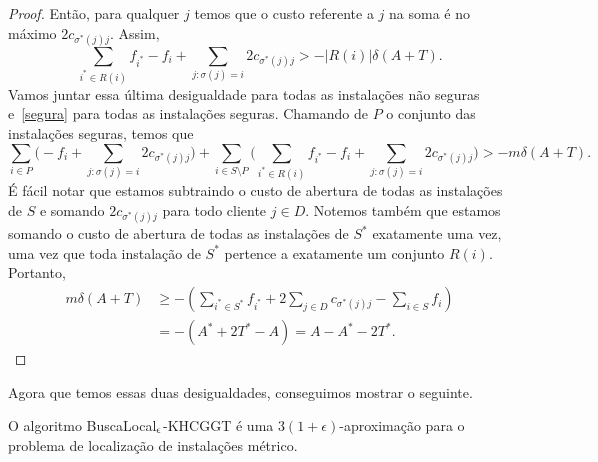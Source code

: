 \begin{proof}
    Então, para qualquer $j$ temos que o custo referente a $j$ na soma é no máximo $2c_{\sigma^*(j)j}$. Assim,
    \[\sum_{i^* \in R(i)}f_{i^*} - f_i + \sum_{j: \sigma(j)= i } 2c_{\sigma^*(j)j} > - |R(i)| \delta(A+T).\]
    Vamos juntar essa última desigualdade para todas as instalações não seguras e~\eqref{segura} para todas as instalações seguras. Chamando de $P$ o conjunto das instalações seguras, temos que
    \[\sum_{i \in P}\Big( - f_i + \sum_{j:\sigma(j) = i} 2c_{\sigma^*(j)j}\Big) + \sum_{i \in S\setminus P}\Big( \sum_{i^* \in R(i)}f_{i^*} - f_i + \sum_{j: \sigma(j)= i } 2c_{\sigma^*(j)j}\Big ) > - m \delta(A+T). \]
    É fácil notar que estamos subtraindo o custo de abertura de todas as instalações de $S$ e somando $2c_{\sigma^*(j)j}$ para todo cliente $j\in D$. Notemos também que estamos somando o custo de abertura de todas as instalações de $S^*$ exatamente uma vez, uma vez que toda instalação de $S^*$ pertence a exatamente um conjunto $R(i)$. Portanto,
    \begin{subequations}
        \begin{align*}
            m\delta(A+T) &\geq - (\sum_{i^* \in S^*}f_{i^*} + 2 \sum_{j \in D} c_{\sigma^*(j)j} - \sum_{i \in S} f_i)\\
            & = - ( A^* + 2 T^* - A ) = A - A^* - 2T^* .
        \end{align*}
    \end{subequations}
\end{proof}

Agora que temos essas duas desigualdades, conseguimos mostrar o seguinte.

\begin{theorem}
    O algoritmo {\sc BuscaLocal$_\epsilon$-KHCGGT} é uma $3(1+\epsilon)$-aproximação para o problema de localização de instalações métrico.
\end{theorem}

